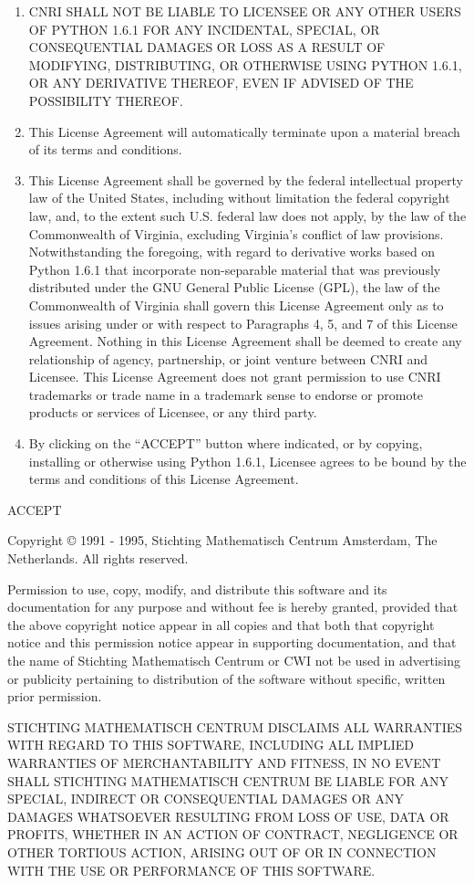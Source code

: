 \begin{enumerate}
\item
CNRI SHALL NOT BE LIABLE TO LICENSEE OR ANY OTHER USERS OF PYTHON
1.6.1 FOR ANY INCIDENTAL, SPECIAL, OR CONSEQUENTIAL DAMAGES OR LOSS AS
A RESULT OF MODIFYING, DISTRIBUTING, OR OTHERWISE USING PYTHON 1.6.1,
OR ANY DERIVATIVE THEREOF, EVEN IF ADVISED OF THE POSSIBILITY THEREOF.

\item
This License Agreement will automatically terminate upon a material
breach of its terms and conditions.

\item
This License Agreement shall be governed by the federal
intellectual property law of the United States, including without
limitation the federal copyright law, and, to the extent such
U.S. federal law does not apply, by the law of the Commonwealth of
Virginia, excluding Virginia's conflict of law provisions.
Notwithstanding the foregoing, with regard to derivative works based
on Python 1.6.1 that incorporate non-separable material that was
previously distributed under the GNU General Public License (GPL), the
law of the Commonwealth of Virginia shall govern this License
Agreement only as to issues arising under or with respect to
Paragraphs 4, 5, and 7 of this License Agreement.  Nothing in this
License Agreement shall be deemed to create any relationship of
agency, partnership, or joint venture between CNRI and Licensee.  This
License Agreement does not grant permission to use CNRI trademarks or
trade name in a trademark sense to endorse or promote products or
services of Licensee, or any third party.

\item
By clicking on the ``ACCEPT'' button where indicated, or by copying,
installing or otherwise using Python 1.6.1, Licensee agrees to be
bound by the terms and conditions of this License Agreement.
\end{enumerate}

\centerline{ACCEPT}



\centerline{}

Copyright \copyright{} 1991 - 1995, Stichting Mathematisch Centrum
Amsterdam, The Netherlands.  All rights reserved.

Permission to use, copy, modify, and distribute this software and its
documentation for any purpose and without fee is hereby granted,
provided that the above copyright notice appear in all copies and that
both that copyright notice and this permission notice appear in
supporting documentation, and that the name of Stichting Mathematisch
Centrum or CWI not be used in advertising or publicity pertaining to
distribution of the software without specific, written prior
permission.

STICHTING MATHEMATISCH CENTRUM DISCLAIMS ALL WARRANTIES WITH REGARD TO
THIS SOFTWARE, INCLUDING ALL IMPLIED WARRANTIES OF MERCHANTABILITY AND
FITNESS, IN NO EVENT SHALL STICHTING MATHEMATISCH CENTRUM BE LIABLE
FOR ANY SPECIAL, INDIRECT OR CONSEQUENTIAL DAMAGES OR ANY DAMAGES
WHATSOEVER RESULTING FROM LOSS OF USE, DATA OR PROFITS, WHETHER IN AN
ACTION OF CONTRACT, NEGLIGENCE OR OTHER TORTIOUS ACTION, ARISING OUT
OF OR IN CONNECTION WITH THE USE OR PERFORMANCE OF THIS SOFTWARE.
